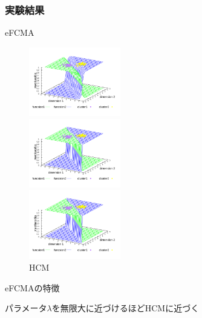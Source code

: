 \documentclass[13pt,dvipdfmx]{beamer}
\begin{document}
\begin{frame}\frametitle{実験結果}
  \begin{block}{eFCMA}
    \begin{figure}[htbp]
      \begin{minipage}{0.32\hsize}
        \begin{center}
          \includegraphics[width=40mm]{eFCMA-Lambda1.pdf}
        \end{center}
        \captionsetup{labelformat=empty,labelsep=none}
        \caption{$\lambda=1$}
        \label{fig:one}
      \end{minipage}
      \begin{minipage}{0.32\hsize}
        \begin{center}
          \includegraphics[width=40mm]{eFCMA-Lambda10000.pdf}
        \end{center}
        \captionsetup{labelformat=empty,labelsep=none}
        \caption{$\lambda=10000$}
        \label{fig:two}
      \end{minipage}
     \begin{minipage}{0.32\hsize}
        \begin{center}
          \includegraphics[width=40mm]{HCM.pdf}
        \end{center}
        \captionsetup{labelformat=empty,labelsep=none}
        \caption{HCM}
      \label{fig:three}
     \end{minipage}
    \end{figure}
  \end{block}
  \begin{block}{eFCMAの特徴}
    \begin{center}
      パラメータ$\lambda$を無限大に近づけるほどHCMに近づく
    \end{center}
  \end{block}
\end{frame}
\end{document}
